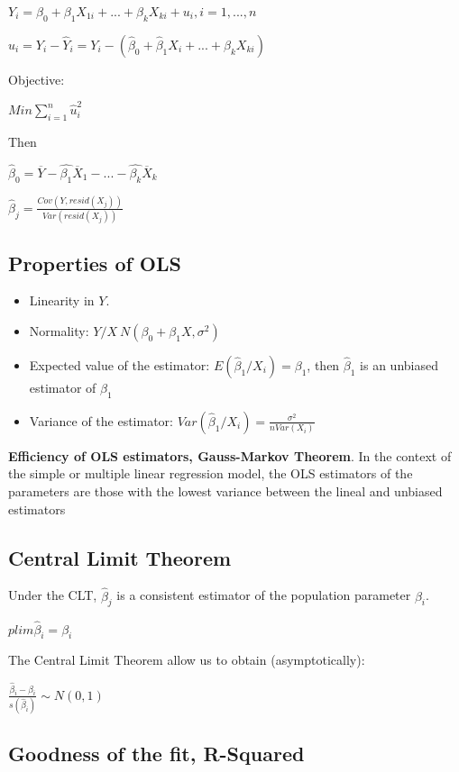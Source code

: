\documentclass[10pt,landscape]{article}
\begin{document}
\begin{multicols}{3}
$Y_i = \beta_0 + \beta_1 X_{1i} + ... + \beta_k X_{ki} + u_i, i = 1,..., n$

$\hat{u}_i = Y_i - \hat{Y}_i = Y_i - (\hat{\beta}_0 + \hat{\beta}_1 X_i + ... + \hat{\beta}_k X_{ki})$

Objective:

$Min \sum_{i=1}^n \hat{u}_i^2$

Then

$\hat{\beta}_0 = \overline{Y} - \hat{\beta_1} \overline{X}_1 - ... - \hat{\beta_k} \overline{X}_k$

$\hat{\beta}_j = \frac{Cov(Y, resid(X_j))}{Var(resid(X_j))}$

\subsection*{Properties of OLS}

\begin{itemize}
\item Linearity in $Y$.
\item Normality: $Y / X ~ N(\beta_0 + \beta_1 X, \sigma^2)$
\item Expected value of the estimator: $E(\hat{\beta}_1 / X_i) = \beta_1$, then $\hat{\beta}_1$ is an unbiased estimator of $\beta_1$
\item Variance of the estimator: $Var(\hat{\beta}_1 / X_i) = \frac{\sigma^2}{n Var(X_i)}$
\end{itemize}

\textbf{Efficiency of OLS estimators, Gauss-Markov Theorem}. In the context of the simple or multiple linear regression model, the OLS estimators of the parameters are those with the lowest variance between the lineal and unbiased estimators

\subsection*{Central Limit Theorem}
Under the CLT, $\hat{\beta}_j$ is a consistent estimator of the population parameter $\beta_i$.

$p lim \hat{\beta}_i = \beta_i$

The Central Limit Theorem allow us to obtain (asymptotically):

$\frac{\hat{\beta}_i - \beta_i}{s(\hat{\beta}_i)} \sim N(0,1)$

\subsection*{Goodness of the fit, R-Squared}


\end{multicols}
\end{document}
